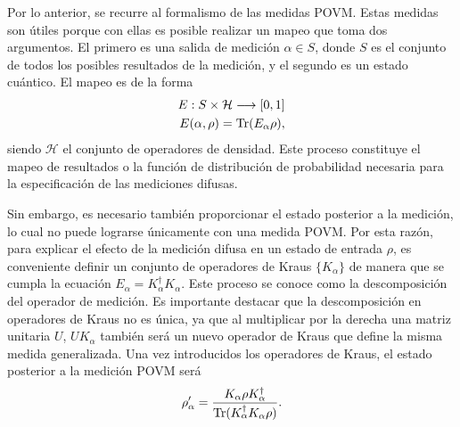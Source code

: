 Por lo anterior, se recurre al formalismo de las medidas POVM\@. Estas medidas son útiles porque con ellas es posible realizar un mapeo que toma dos argumentos. El primero es una salida de medición $\alpha \in S $, donde $S$ es el conjunto de todos los posibles resultados de la medición, y el segundo es un estado cuántico. El mapeo es de la forma 
\begin{equation}\begin{split}
    E:S\times \mathcal{H}\longrightarrow [0,1]\\
    E(\alpha,\rho)={\rm Tr}(E_\alpha\rho),
\end{split}\end{equation}siendo $\mathcal{H}$ el conjunto de operadores de densidad. Este proceso constituye el mapeo de resultados o la función de distribución de probabilidad necesaria para la especificación de las mediciones difusas.



Sin embargo, es necesario también proporcionar el estado posterior a la medición, lo cual no puede lograrse únicamente con una medida POVM\@. Por esta razón, para explicar el efecto de la medición difusa en un estado de entrada $\rho$, es conveniente definir un conjunto de operadores de Kraus $\{K_\alpha\}$ de manera que se cumpla la ecuación $E_\alpha=K_\alpha^\dagger K_\alpha$. Este proceso se conoce como la descomposición del operador de medición. Es importante destacar que la descomposición en operadores de Kraus no es única, ya que al multiplicar por la derecha una matriz unitaria $U$, $UK_{\alpha}$ también será un nuevo operador de Kraus que define la misma medida generalizada. Una vez introducidos los operadores de Kraus, el estado posterior a la medición POVM será \begin{equation}\rho'_\alpha=\dfrac{K_\alpha \rho
    K_\alpha^\dagger}{{\rm Tr}(K_\alpha^\dagger K_\alpha \rho)}.\end{equation}






